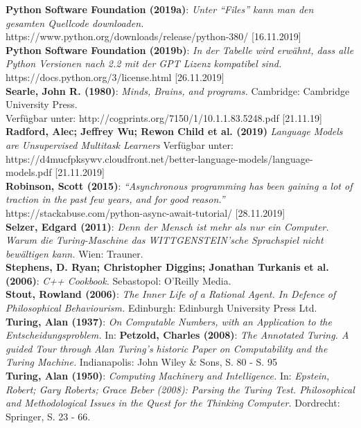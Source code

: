 \documentclass[10pt,a4paper]{article}
\begin{document}
\textbf{Python Software Foundation (2019a)}: \textit{Unter \enquote{Files} kann man den gesamten Quellcode downloaden.} \\ https://www.python.org/downloads/release/python-380/ [16.11.2019] \\
\textbf{Python Software Foundation (2019b)}: \textit{In der Tabelle wird erwähnt, dass alle Python Versionen nach 2.2 mit der GPT Lizenz kompatibel sind.} https://docs.python.org/3/license.html [26.11.2019] \\
\textbf{Searle, John R. (1980)}: \textit{Minds, Brains, and programs.} Cambridge: Cambridge University Press. \\ Verfügbar unter: http://cogprints.org/7150/1/10.1.1.83.5248.pdf [21.11.19]
\textbf{Radford, Alec; Jeffrey Wu; Rewon Child et al. (2019)} \textit{Language Models are Unsupervised Multitask Learners} Verfügbar unter: \\ https://d4mucfpksywv.cloudfront.net/better-language-models/language-models.pdf [21.11.2019] \\
\textbf{Robinson, Scott (2015)}: \textit{\enquote{Asynchronous programming has been gaining a lot of traction in the past few years, and for good reason.}} \\
https://stackabuse.com/python-async-await-tutorial/ [28.11.2019] \\
\textbf{Selzer, Edgard (2011)}: \textit{Denn der Mensch ist mehr als nur ein Computer. Warum die Turing-Maschine das WITTGENSTEIN'sche Sprachspiel nicht bewältigen kann.} Wien: Trauner. \\
\textbf{Stephens, D. Ryan; Christopher Diggins; Jonathan Turkanis et al. (2006)}: \textit{C++ Cookbook.} Sebastopol: O'Reilly Media. \\
\textbf{Stout, Rowland (2006)}: \textit{The Inner Life of a Rational Agent. In Defence of Philosophical Behaviourism.} Edinburgh: Edinburgh University Press Ltd. \\
\textbf{Turing, Alan (1937)}: \textit{On Computable Numbers, with an Application to the Entscheidungsproblem.} In: \textbf{Petzold, Charles (2008)}: \textit{The Annotated Turing. A guided Tour through Alan Turing’s historic Paper on Computability and the Turing Machine.} Indianapolis: John Wiley \& Sons, S. 80 - S. 95 \\
\textbf{Turing, Alan (1950)}: \textit{Computing Machinery and Intelligence.} In: \textit{Epstein, Robert; Gary Roberts; Grace Beber (2008): Parsing the Turing Test.  Philosophical and Methodological Issues in the Quest for the Thinking Computer.} Dordrecht: Springer, S. 23 - 66. \\
\end{document}
